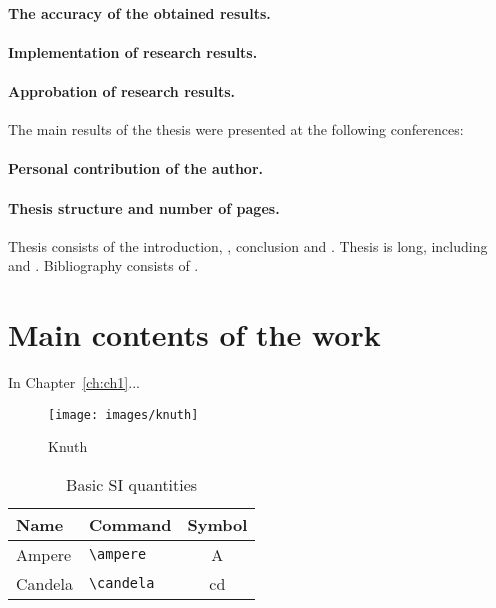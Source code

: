 \paragraph*{The accuracy of the obtained results.}

\paragraph*{Implementation of research results.}
\paragraph*{Approbation of research results.}
The main results of the thesis were presented at the following conferences:
\printConferenceEN

\paragraph*{Personal contribution of the author.}
\paragraph*{Thesis structure and number of pages.}

Thesis consists of the introduction,
,
conclusion and 
.
Thesis is 
 long, including
 and
.
Bibliography consists of
.


\newpage
\section*{Main contents of the work}

In Chapter~\ref{ch:ch1}...

\begin{figure}
	\centering
	\texttt{[image: images/knuth]}
	\caption{Knuth}
\end{figure}
\begin{table}
	\centering
	\caption{Basic SI quantities}%
	\begin{tabular}{llc}
		\toprule
		Name 	& 	Command 	& 	Symbol         \\
		\midrule
		Ampere     & \verb|\ampere| & \si{\ampere}   \\
		Candela   & \verb|\candela| & \si{\candela}  \\
		\bottomrule
	\end{tabular}
\end{table}

